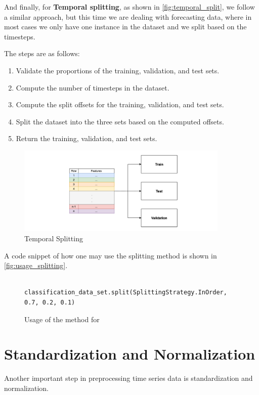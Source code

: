 \documentclass[review]{AIM_report}
\begin{document}
And finally, for \textbf{Temporal splitting}, as shown in \autoref{fig:temporal_split}, we follow a similar approach, but this time we are dealing with forecasting data, where in most cases we only have one instance in the dataset and we split based on the timesteps.

The steps are as follows:
\begin{enumerate}
    \item Validate the proportions of the training, validation, and test sets.
    \item Compute the number of timesteps in the dataset.
    \item Compute the split offsets for the training, validation, and test sets.
    \item Split the dataset into the three sets based on the computed offsets.
    \item Return the training, validation, and test sets.
\end{enumerate}

\begin{figure}
    \centering
    \includegraphics[width=0.9\textwidth]{files/splitting/temporal_split.png}
    \caption{Temporal Splitting}
    \label{fig:temporal_split}
\end{figure}

A code snippet of how one may use the splitting method is shown in \autoref{fig:usage_splitting}.

\begin{figure}[H]
    \begin{lstlisting}[style=python]

classification_data_set.split(SplittingStrategy.InOrder, 0.7, 0.2, 0.1)
    \end{lstlisting}
    \caption{Usage of the \splitShort method for \classificationDataSet}
    \label{fig:usage_splitting}
\end{figure}

\newpage
\section{Standardization and Normalization}
Another important step in preprocessing time series data is standardization and normalization.
\end{document}
